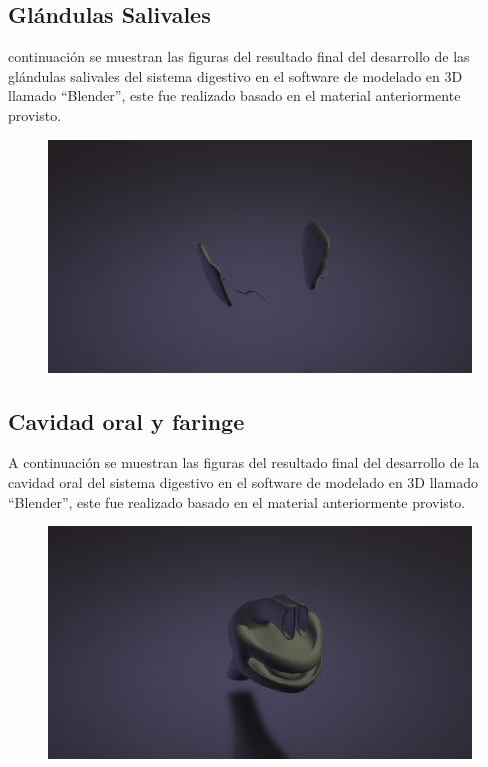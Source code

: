 \subsection{Glándulas Salivales}
 continuación se muestran las figuras del resultado final del desarrollo de las glándulas salivales del sistema digestivo 
 en el software de modelado en 3D llamado “Blender”, este fue realizado basado en el material anteriormente provisto.\\
\begin{figure}[H]
	\begin{center}
 		\includegraphics[width = .5\textwidth]{source/images/image41.png}
	\end{center} 
\end{figure}

\subsection{Cavidad oral y faringe}
A continuación se muestran las figuras del resultado final del desarrollo de la cavidad oral del sistema digestivo en el software de modelado en 3D llamado “Blender”, este fue realizado basado en el material anteriormente provisto.\\
\begin{figure}[H]
	\begin{center}
 		\includegraphics[width = .5\textwidth]{source/images/image14.png}
	\end{center} 
\end{figure}

